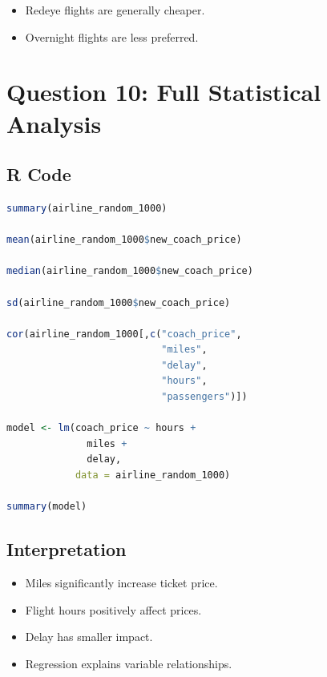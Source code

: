 \documentclass[12pt,a4paper]{article}
\begin{document}
\begin{itemize}
\item Redeye flights are generally cheaper.
\item Overnight flights are less preferred.
\end{itemize}


\section{Question 10: Full Statistical Analysis}

\subsection{R Code}

\begin{lstlisting}[language=R]
summary(airline_random_1000)

mean(airline_random_1000$new_coach_price)

median(airline_random_1000$new_coach_price)

sd(airline_random_1000$new_coach_price)

cor(airline_random_1000[,c("coach_price",
                           "miles",
                           "delay",
                           "hours",
                           "passengers")])

model <- lm(coach_price ~ hours +
              miles +
              delay,
            data = airline_random_1000)

summary(model)
\end{lstlisting}

\subsection{Interpretation}

\begin{itemize}
\item Miles significantly increase ticket price.
\item Flight hours positively affect prices.
\item Delay has smaller impact.
\item Regression explains variable relationships.
\end{itemize}

\end{document}
